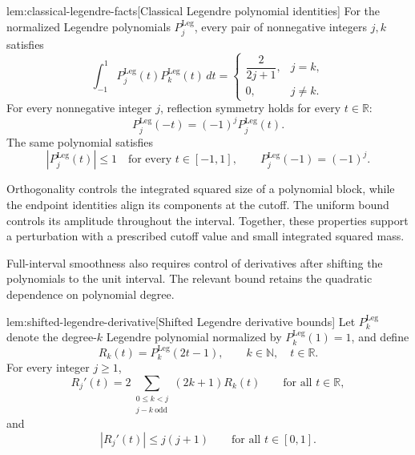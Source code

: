 \documentclass[11pt]{article}
\begin{document}
\begin{theoremv}{lem:classical-legendre-facts}[Classical Legendre polynomial identities]
For the normalized Legendre polynomials \(P_j^{\mathrm{Leg}}\), every pair of nonnegative integers \(j,k\) satisfies
\[
\int_{-1}^{1} P_j^{\mathrm{Leg}}(t)P_k^{\mathrm{Leg}}(t)\,dt
=
\begin{cases}
\dfrac{2}{2j+1}, & j=k,\\
0, & j\ne k.
\end{cases}
\]
For every nonnegative integer \(j\), reflection symmetry holds for every \(t\in\mathbb R\):
\[
P_j^{\mathrm{Leg}}(-t)=(-1)^jP_j^{\mathrm{Leg}}(t).
\]
The same polynomial satisfies
\[
|P_j^{\mathrm{Leg}}(t)|\le 1
\quad\text{for every }t\in[-1,1],
\qquad
P_j^{\mathrm{Leg}}(-1)=(-1)^j.
\]
\end{theoremv}

Orthogonality controls the integrated squared size of a polynomial block, while the endpoint identities align its components at the cutoff. The uniform bound controls its amplitude throughout the interval. Together, these properties support a perturbation with a prescribed cutoff value and small integrated squared mass.

Full-interval smoothness also requires control of derivatives after shifting the polynomials to the unit interval. The relevant bound retains the quadratic dependence on polynomial degree.

\begin{lemmav}{lem:shifted-legendre-derivative}[Shifted Legendre derivative bounds]
Let \(P_k^{\mathrm{Leg}}\) denote the degree-\(k\) Legendre polynomial normalized by \(P_k^{\mathrm{Leg}}(1)=1\), and define
\[
R_k(t)=P_k^{\mathrm{Leg}}(2t-1),\qquad k\in\mathbb N,\quad t\in\mathbb R.
\]
For every integer \(j\ge1\),
\[
R_j'(t)=2\sum_{\substack{0\le k<j\\j-k\ \mathrm{odd}}}(2k+1)R_k(t)
\qquad\text{for all }t\in\mathbb R,
\]
and
\[
|R_j'(t)|\le j(j+1)
\qquad\text{for all }t\in[0,1].
\]
\end{lemmav}
\end{document}
